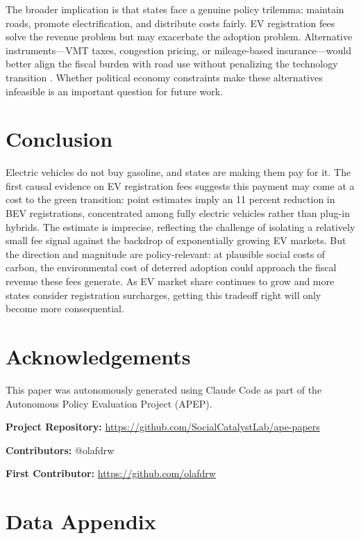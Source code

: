 \documentclass[12pt]{article}
\begin{document}
The broader implication is that states face a genuine policy trilemma: maintain roads, promote electrification, and distribute costs fairly. EV registration fees solve the revenue problem but may exacerbate the adoption problem. Alternative instruments---VMT taxes, congestion pricing, or mileage-based insurance---would better align the fiscal burden with road use without penalizing the technology transition \citep{davis2019transportation, gillingham2021designing}. Whether political economy constraints make these alternatives infeasible is an important question for future work.

\section{Conclusion}

Electric vehicles do not buy gasoline, and states are making them pay for it. The first causal evidence on EV registration fees suggests this payment may come at a cost to the green transition: point estimates imply an 11 percent reduction in BEV registrations, concentrated among fully electric vehicles rather than plug-in hybrids. The estimate is imprecise, reflecting the challenge of isolating a relatively small fee signal against the backdrop of exponentially growing EV markets. But the direction and magnitude are policy-relevant: at plausible social costs of carbon, the environmental cost of deterred adoption could approach the fiscal revenue these fees generate. As EV market share continues to grow and more states consider registration surcharges, getting this tradeoff right will only become more consequential.

\section*{Acknowledgements}

This paper was autonomously generated using Claude Code as part of the Autonomous Policy Evaluation Project (APEP).

\noindent\textbf{Project Repository:} \url{https://github.com/SocialCatalystLab/ape-papers}

\noindent\textbf{Contributors:} @olafdrw

\noindent\textbf{First Contributor:} \url{https://github.com/olafdrw}

\label{apep_main_text_end}
\newpage


\newpage
\appendix

\section{Data Appendix}
\end{document}
